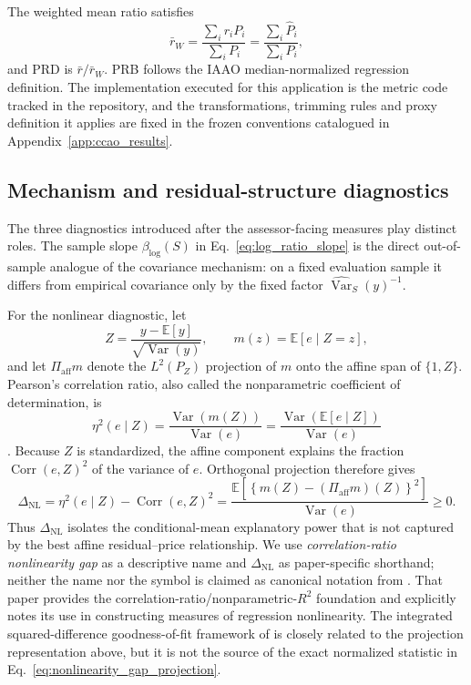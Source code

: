 \documentclass[10pt]{article}
\theoremstyle{definition}
\newcommand{\E}{\mathbb{E}}
\newcommand{\Corr}{\operatorname{Corr}}
\newcommand{\Var}{\operatorname{Var}}
\newcommand{\1}{\mathbf{1}}
\begin{document}
The weighted mean ratio satisfies
\[
\bar r_W
=
\frac{\sum_i r_iP_i}{\sum_iP_i}
=
\frac{\sum_i\widehat P_i}{\sum_iP_i},
\]
and PRD is $\bar r/\bar r_W$. PRB follows the IAAO median-normalized regression
definition. The implementation executed for this application is the metric code tracked in the
repository, and the transformations, trimming rules and proxy definition it applies are fixed in
the frozen conventions catalogued in Appendix~\ref{app:ccao_results}.

\subsection{Mechanism and residual-structure diagnostics}

The three diagnostics introduced after the assessor-facing measures play distinct
roles. The sample slope $\beta_{\log}(S)$ in Eq.~\eqref{eq:log_ratio_slope} is the
direct out-of-sample analogue of the covariance mechanism: on a fixed evaluation
sample it differs from empirical covariance only by the fixed factor
$\widehat{\Var}_S(y)^{-1}$.

For the nonlinear diagnostic, let
\[
Z=\frac{y-\E[y]}{\sqrt{\Var(y)}},
\qquad
m(z)=\E[e\mid Z=z],
\]
and let $\Pi_{\mathrm{aff}}m$ denote the $L^2(P_Z)$ projection of $m$ onto the
affine span of $\{1,Z\}$. Pearson's correlation ratio, also called the
nonparametric coefficient of determination, is
\[
\eta^2(e\mid Z)
=
\frac{\Var\!\left(m(Z)\right)}{\Var(e)}
=
\frac{\Var\!\left(\E[e\mid Z]\right)}{\Var(e)}
\]
\cite{DoksumSamarov1995}. Because $Z$ is standardized, the affine component explains
the fraction $\Corr(e,Z)^2$ of the variance of $e$. Orthogonal projection therefore
gives
\begin{equation}
\label{eq:nonlinearity_gap_projection}
\Delta_{\mathrm{NL}}
=
\eta^2(e\mid Z)-\Corr(e,Z)^2
=
\frac{
\E\!\left[
\left\{
m(Z)-(\Pi_{\mathrm{aff}}m)(Z)
\right\}^2
\right]
}{
\Var(e)
}
\geq 0.
\end{equation}
Thus $\Delta_{\mathrm{NL}}$ isolates the conditional-mean explanatory power that is
not captured by the best affine residual--price relationship. We use
\emph{correlation-ratio nonlinearity gap} as a descriptive name and
$\Delta_{\mathrm{NL}}$ as paper-specific shorthand; neither the name nor the symbol
is claimed as canonical notation from \textcite{DoksumSamarov1995}. That paper
provides the correlation-ratio/nonparametric-$R^2$ foundation and explicitly notes
its use in constructing measures of regression nonlinearity. The integrated
squared-difference goodness-of-fit framework of \textcite{HardleMammen1993} is
closely related to the projection representation above, but it is not the source of
the exact normalized statistic in Eq.~\eqref{eq:nonlinearity_gap_projection}.
\end{document}
